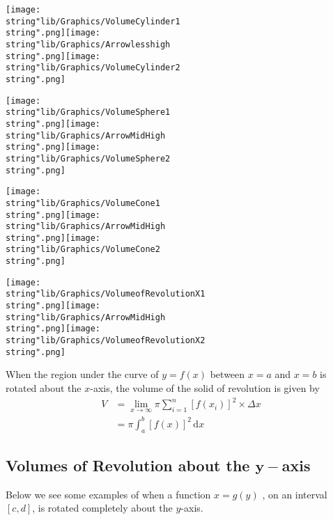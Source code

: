 \documentclass[11pt,a4paper]{book}
\begin{document}
\texttt{[image: \\string"lib/Graphics/VolumeCylinder1\\string".png]}\hspace{1cm}\texttt{[image: \\string"lib/Graphics/Arrowlesshigh\\string".png]}\hspace{1cm}\texttt{[image: \\string"lib/Graphics/VolumeCylinder2\\string".png]}

\texttt{[image: \\string"lib/Graphics/VolumeSphere1\\string".png]}\hspace{1cm}\texttt{[image: \\string"lib/Graphics/ArrowMidHigh\\string".png]}\hspace{1cm}\texttt{[image: \\string"lib/Graphics/VolumeSphere2\\string".png]}

\texttt{[image: \\string"lib/Graphics/VolumeCone1\\string".png]}\hspace{1cm}\texttt{[image: \\string"lib/Graphics/ArrowMidHigh\\string".png]}\hspace{1cm}\texttt{[image: \\string"lib/Graphics/VolumeCone2\\string".png]}

\texttt{[image: \\string"lib/Graphics/VolumeofRevolutionX1\\string".png]}\hspace{1cm}\texttt{[image: \\string"lib/Graphics/ArrowMidHigh\\string".png]}\hspace{1cm}\texttt{[image: \\string"lib/Graphics/VolumeofRevolutionX2\\string".png]}

\begin{tcolorbox}[colback=blue!5, colframe=black, boxrule=.4pt, sharpish corners]
When the region under the curve of $y=f(x)$ between $x=a$ and $x=b$ is rotated about the $x$-axis, the volume of the solid of revolution is given by
\begin{align*} V & =\lim_{x\rightarrow\infty}\pi\sum_{i=1}^{n}[f(x_{i})]^{2}\times\Delta x\\  & =\pi\int_{a}^{b}[f(x)]^{2}\,\mathrm{d}x \end{align*}
\end{tcolorbox}

\newpage{}

\subsection{Volumes of Revolution about the $\boldsymbol{y-}$axis}

Below we see some examples of when a function $x=g(y)$ , on an interval
$[c,d]$, is rotated completely about the $y$-axis.
\end{document}
